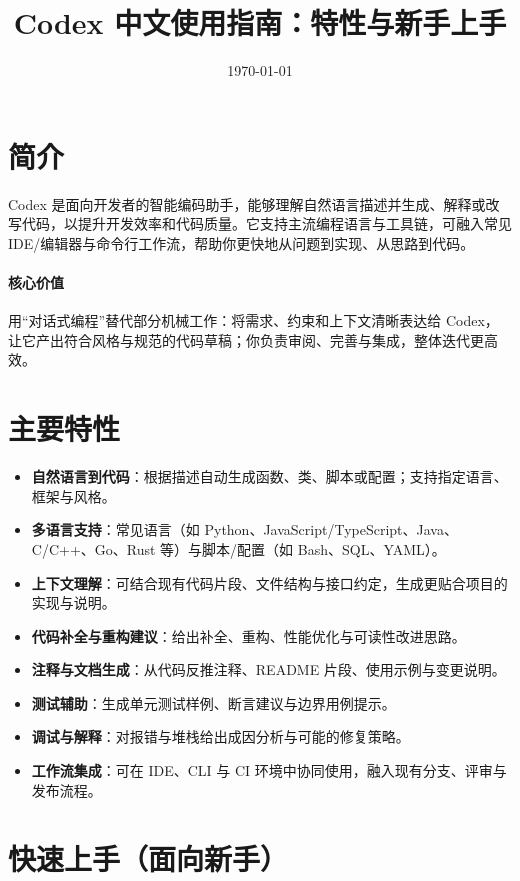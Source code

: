 \documentclass[UTF8,zihao=-4]{ctexart}
\title{Codex 中文使用指南：特性与新手上手}
\author{}
\date{\today}
\begin{document}
\maketitle
\tableofcontents
\vspace{0.5em}

\section{简介}
Codex 是面向开发者的智能编码助手，能够理解自然语言描述并生成、解释或改写代码，以提升开发效率和代码质量。它支持主流编程语言与工具链，可融入常见 IDE/编辑器与命令行工作流，帮助你更快地从问题到实现、从思路到代码。

\paragraph{核心价值}
用“对话式编程”替代部分机械工作：将需求、约束和上下文清晰表达给 Codex，让它产出符合风格与规范的代码草稿；你负责审阅、完善与集成，整体迭代更高效。

\section{主要特性}
\begin{itemize}
  \item \textbf{自然语言到代码}：根据描述自动生成函数、类、脚本或配置；支持指定语言、框架与风格。
  \item \textbf{多语言支持}：常见语言（如 Python、JavaScript/TypeScript、Java、C/C++、Go、Rust 等）与脚本/配置（如 Bash、SQL、YAML）。
  \item \textbf{上下文理解}：可结合现有代码片段、文件结构与接口约定，生成更贴合项目的实现与说明。
  \item \textbf{代码补全与重构建议}：给出补全、重构、性能优化与可读性改进思路。
  \item \textbf{注释与文档生成}：从代码反推注释、README 片段、使用示例与变更说明。
  \item \textbf{测试辅助}：生成单元测试样例、断言建议与边界用例提示。
  \item \textbf{调试与解释}：对报错与堆栈给出成因分析与可能的修复策略。
  \item \textbf{工作流集成}：可在 IDE、CLI 与 CI 环境中协同使用，融入现有分支、评审与发布流程。
\end{itemize}

\section{快速上手（面向新手）}
\end{document}
